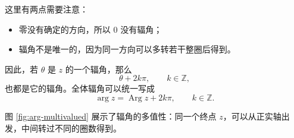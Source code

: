 这里有两点需要注意：
\begin{itemize}
    \item 零没有确定的方向，所以 $0$ 没有辐角；
    \item 辐角不是唯一的，因为同一方向可以多转若干整圈后得到。
\end{itemize}

因此，若 $\theta$ 是 $z$ 的一个辐角，那么
\begin{equation}
    \theta+2k\pi,\qquad k\in\mathbb{Z},
\end{equation}
也都是它的辐角。全体辐角可以统一写成
\begin{equation}
    \arg z=\operatorname{Arg}z+2k\pi,\qquad k\in\mathbb{Z}.
\end{equation}

图 \ref{fig:arg-multivalued} 展示了辐角的多值性：同一个终点 $z$，可以从正实轴出发，中间转过不同的圈数得到。

